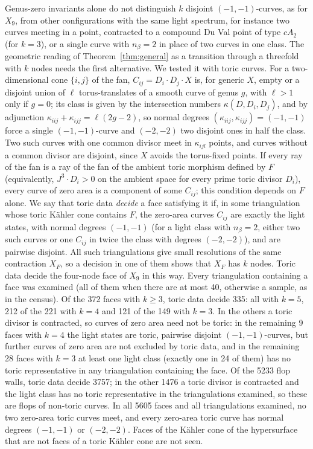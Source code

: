 Genus-zero invariants alone do not distinguish $k$ disjoint $(-1,-1)$-curves, as for $X_9$, from other
configurations with the same light spectrum, for instance two curves meeting in a point, contracted to a
compound Du Val point of type $cA_2$ (for $k=3$), or a single curve with $n_\beta=2$ in place of two curves
in one class. The geometric reading of Theorem~\ref{thm:general} as a transition through a threefold with
$k$ nodes needs the first alternative. We tested it with toric curves. For a two-dimensional cone
$\{i,j\}$ of the fan, $C_{ij}=D_i\cdot D_j\cdot X$ is, for generic $X$, empty or a disjoint union of $\ell$
torus-translates of a smooth curve of genus $g$, with $\ell>1$ only if $g=0$; its class is given by the
intersection numbers $\kappa(D,D_i,D_j)$, and by adjunction $\kappa_{iij}+\kappa_{ijj}=\ell(2g-2)$, so normal
degrees $(\kappa_{iij},\kappa_{ijj})=(-1,-1)$ force a single $(-1,-1)$-curve and $(-2,-2)$ two disjoint ones
in half the class. Two such curves with one common divisor meet in $\kappa_{ijl}$ points, and curves without
a common divisor are disjoint, since $X$ avoids the torus-fixed points. If every ray of the fan is a ray of
the fan of the ambient toric morphism defined by $F$ (equivalently, $J^3\cdot D_i>0$ on the ambient space for
every prime toric divisor $D_i$), every curve of zero area is a component of some $C_{ij}$; this condition
depends on $F$ alone. We say that toric data \emph{decide} a face satisfying it if, in some triangulation whose toric K\"ahler cone
contains $F$, the zero-area curves $C_{ij}$ are exactly the light states, with normal degrees $(-1,-1)$ (for
a light class with $n_\beta=2$, either two such curves or one $C_{ij}$ in twice the class with degrees
$(-2,-2)$), and are pairwise disjoint. All such triangulations give small resolutions of the same
contraction $X_F$, so a decision in one of them shows that $X_F$ has $k$ nodes. Toric data decide the four-node face of
$X_9$ in this way. Every triangulation containing a face was examined (all of them when there
are at most 40, otherwise a sample, as in the census). Of the 372 faces with $k\geq3$, toric data decide 335: all
with $k=5$, 212 of the 221 with $k=4$ and 121 of the 149 with
$k=3$. In the others a toric divisor is contracted, so curves of zero area need not be toric: in the
remaining 9 faces with $k=4$ the light states are toric, pairwise disjoint $(-1,-1)$-curves, but further
curves of zero area are not excluded by toric data, and in the remaining 28 faces with $k=3$ at least one
light class (exactly one in 24 of them) has no toric representative in any triangulation containing the
face. Of the 5233 flop walls, toric data decide 3757; in the other 1476 a toric
divisor is contracted and the light class has no toric representative in the triangulations examined, so
these are flops of non-toric curves. In all 5605 faces and all triangulations examined, no two zero-area
toric curves meet, and every zero-area toric curve has normal degrees $(-1,-1)$ or $(-2,-2)$. Faces of the
K\"ahler cone of the hypersurface that are not faces of a toric K\"ahler cone are not seen.

